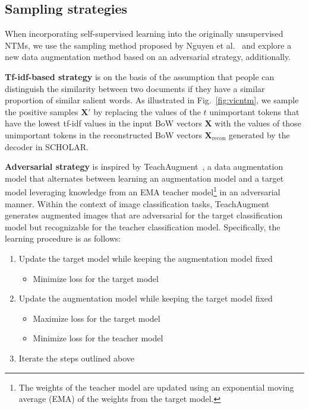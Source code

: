 \documentclass{article}
\begin{document}
\subsection{Sampling strategies}\label{sampling strategies}
When incorporating self-supervised learning into the originally unsupervised NTMs, we use the sampling method proposed by Nguyen et al.~\cite{nguyen2021contrastive} and explore a new data augmentation method based on an adversarial strategy, additionally.
\par
\noindent
{\bf Tf-idf-based strategy} is on the basis of the assumption that people can distinguish the similarity between two documents if they have a similar proportion of similar salient words. 
As illustrated in Fig.~\ref{fig:vicntm}, we sample the positive samples $\boldsymbol{X'}$ by replacing the values of the $t$ unimportant tokens that have the lowest tf-idf values in the input BoW vectors $\boldsymbol{X}$ with the values of those unimportant tokens in the reconstructed BoW vectors $\boldsymbol{X}_{\text{recon}}$ generated by the decoder in SCHOLAR.
\par
\noindent
{\bf Adversarial strategy} is inspired by TeachAugment~\cite{Suzuki_2022_CVPR}, a data augmentation model that alternates between learning an augmentation model and a target model leveraging knowledge from an EMA teacher model\footnote{The weights of the teacher model are updated using an exponential moving average (EMA) of the weights from the target model.} in an adversarial manner.
Within the context of image classification tasks, TeachAugment generates augmented images that are adversarial for the target classification model but recognizable for the teacher classification model.
Specifically, the learning procedure is as follows:
\begin{enumerate}
    \item Update the target model while keeping the augmentation model fixed
    \begin{itemize}
        \item Minimize loss for the target model
    \end{itemize}
    \item Update the augmentation model while keeping the target model fixed
    \begin{itemize}
        \item Maximize loss for the target model
        \item Minimize loss for the teacher model
    \end{itemize}
    \item Iterate the steps outlined above
\end{enumerate}
\end{document}
